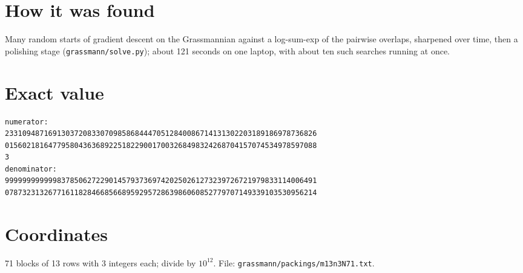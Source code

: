 \documentclass[11pt,a4paper]{article}
\begin{document}
\section{How it was found}
Many random starts of gradient descent on the Grassmannian against a log-sum-exp of the pairwise overlaps, sharpened over time, then a polishing stage (\texttt{grassmann/solve.py}); about 121 seconds on one laptop, with about ten such searches running at once.


\appendix
\section{Exact value}
{\small
\begin{verbatim}
numerator:
233109487169130372083307098586844470512840086714131302203189186978736826
015602181647795804363689225182290017003268498324268704157074534978597088
3
denominator:
999999999999837850627229014579373697420250261273239726721979833114006491
078732313267716118284668566895929572863986060852779707149339103530956214
\end{verbatim}}

\section{Coordinates}
71 blocks of 13 rows with 3 integers each; divide by $10^{12}$. File: \texttt{grassmann/packings/m13n3N71.txt}.
{\tiny
\begin{multicols}{3}
\end{multicols}}
\end{document}
